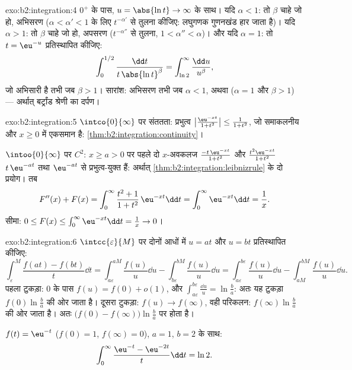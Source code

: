 \begin{solution}{exo:b2:integration:4}
$0^+$ के पास, $u = \abs{\ln t} \to \infty$ के साथ। यदि $\alpha < 1$: तो $\beta$ चाहे जो हो, अभिसरण ($\alpha < \alpha' < 1$ के लिए
$t^{-\alpha'}$ से तुलना कीजिए: लघुगणक गुणनखंड हार जाता है)। यदि $\alpha > 1$: तो $\beta$ चाहे जो
हो, अपसरण ($t^{-\alpha''}$ से तुलना, $1 < \alpha'' < \alpha$)। और यदि $\alpha = 1$: तो $t =
\eu^{-u}$ प्रतिस्थापित कीजिए:
\[
\int_0^{1/2} \frac{\dd t}{t\,\abs{\ln t}^\beta}
= \int_{\ln 2}^{\infty} \frac{\dd u}{u^\beta},
\]
जो अभिसारी है तभी जब $\beta > 1$। सारांश: अभिसरण तभी जब $\alpha < 1$, अथवा ($\alpha = 1$ और
$\beta > 1$) --- अर्थात् बर्ट्रांड श्रेणी का दर्पण।
\end{solution}

\begin{solution}{exo:b2:integration:5}
$\intco{0}{\infty}$ पर संततता: प्रभुत्व $\bigl|\frac{\eu^{-xt}}{1+t^2}\bigr| \leq \frac{1}{1+t^2}$, जो समाकलनीय और $x \geq 0$ में एकसमान है: \cref{thm:b2:integration:continuity}।

$\intoo{0}{\infty}$ पर $C^2$: $x \geq a > 0$ पर पहले दो $x$-अवकलज $\frac{-t\,\eu^{-xt}}{1+t^2}$ और $\frac{t^2\eu^{-xt}}{1+t^2}$ $t\,\eu^{-at}$ तथा $\eu^{-at}$ से
प्रभुत्व-युक्त हैं: अर्थात् \cref{thm:b2:integration:leibnizrule} के दो प्रयोग। तब
\[
F''(x) + F(x) = \int_0^\infty \frac{t^2 + 1}{1 + t^2}\,\eu^{-xt}\dd
t = \int_0^\infty \eu^{-xt}\dd t = \frac1x .
\]
सीमा: $0 \leq F(x) \leq \int_0^\infty \eu^{-xt}\dd t = \frac1x \to
0$।
\end{solution}

\begin{solution}{exo:b2:integration:6}
$\intcc{\varepsilon}{M}$ पर दोनों आधों में $u = at$ और $u = bt$ प्रतिस्थापित कीजिए:
\[
\int_\varepsilon^M \frac{f(at) - f(bt)}{t}\dd t
= \int_{a\varepsilon}^{aM}\frac{f(u)}{u}\dd u
- \int_{b\varepsilon}^{bM}\frac{f(u)}{u}\dd u
= \int_{a\varepsilon}^{b\varepsilon} \frac{f(u)}{u}\dd u
- \int_{aM}^{bM} \frac{f(u)}{u}\dd u .
\]
पहला टुकड़ा: $0$ के पास $f(u) = f(0) + o(1)$, और $\int_{a\varepsilon}
^{b\varepsilon} \frac{\dd u}{u} = \ln\frac ba$: अतः यह टुकड़ा $f(0)\ln\frac ba$ की ओर जाता है।
दूसरा टुकड़ा: $f(u) \to f(\infty)$, वही परिकलन: $f(\infty)\ln\frac ba$ की ओर जाता है। अतः  $\bigl(f(0) - f(\infty)\bigr)\ln\frac ba$
पर  होता है।

$f(t) = \eu^{-t}$ ($f(0) = 1$, $f(\infty) = 0$), $a = 1$, $b
= 2$ के साथ:
\[
\int_0^\infty \frac{\eu^{-t} - \eu^{-2t}}{t}\dd t = \ln 2 .
\]
\end{solution}

